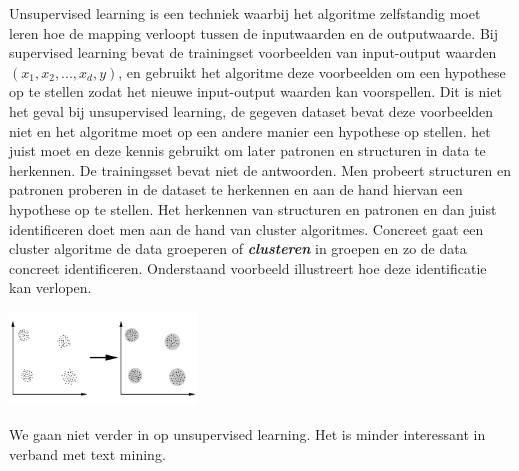 Unsupervised learning is een techniek waarbij het algoritme zelfstandig moet leren hoe de mapping verloopt tussen de inputwaarden en de outputwaarde. Bij supervised learning bevat de trainingset voorbeelden van input-output waarden $(x_{1},x_{2},...,x_{d},y)$, en gebruikt het algoritme deze voorbeelden om een hypothese op te stellen zodat het nieuwe input-output waarden kan voorspellen. Dit is niet het geval bij unsupervised learning, de gegeven dataset bevat deze voorbeelden niet en het algoritme moet op een andere manier een hypothese op stellen.  het juist moet en deze kennis gebruikt om later patronen en structuren in data te herkennen. De trainingsset bevat niet de antwoorden.
\newline
Men probeert structuren en patronen proberen in de dataset te herkennen en aan de hand hiervan een hypothese op te stellen. Het herkennen van structuren en patronen en dan juist identificeren doet men aan de hand van cluster algoritmes. Concreet gaat een cluster algoritme de data groeperen of \textbf{\textit{clusteren}} in groepen en zo de data concreet identificeren. Onderstaand voorbeeld illustreert hoe deze identificatie kan verlopen.\\


\begin{center}
  \includegraphics[width=5cm]{clustering}
\end{center}
\newline
We gaan niet verder in op unsupervised learning. Het is minder interessant in verband met text mining.
